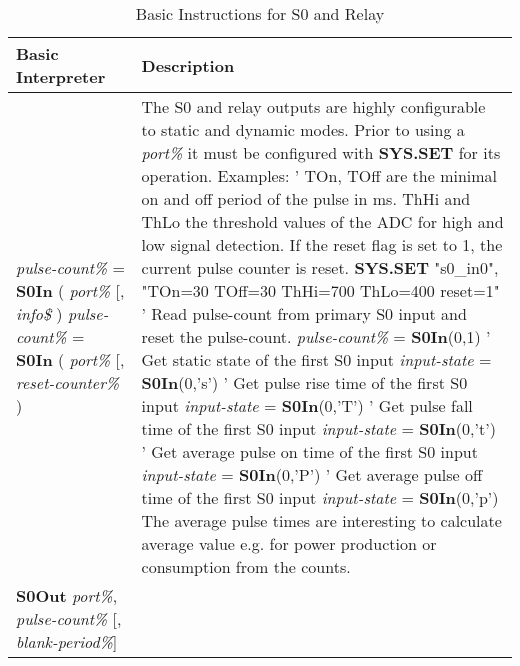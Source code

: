\begin{table}[]
\centering
\caption{Basic Instructions for S0 and Relay}
\label{Basic_Instructions_for_S0_relay}
\begin{tabular}{|p{4cm}|p{10cm}|}
\hline
\textbf{Basic Interpreter} & \textbf{Description}                                                   \\ \hline
\textit{pulse-count\%} = \textbf{S0In} ( \textit{port\%} [, \textit{info\$} )\newline
\textit{pulse-count\%} = \textbf{S0In} ( \textit{port\%} [, \textit{reset-counter\%} )
& The S0 and relay outputs are highly configurable to static and dynamic modes. Prior to using a \textit{port\%} it must be configured with \textbf{SYS.SET} for its operation.\newline
Examples:\newline
' TOn, TOff are the minimal on and off period of the pulse in ms. ThHi and ThLo the threshold values of the ADC for high and low signal detection. If the reset flag is set to 1, the current pulse counter is reset.\newline
\textbf{SYS.SET} "s0\_in0", "TOn=30 TOff=30 ThHi=700 ThLo=400 reset=1"\newline
' Read pulse-count from primary S0 input and reset the pulse-count.\newline
\textit{pulse-count\%} = \textbf{S0In}(0,1)\newline       
' Get static state of the first S0 input\newline
\textit{input-state} = \textbf{S0In}(0,'s')\newline
' Get pulse rise time of the first S0 input\newline
\textit{input-state} = \textbf{S0In}(0,'T')\newline
' Get pulse fall time of the first S0 input\newline
\textit{input-state} = \textbf{S0In}(0,'t')\newline
' Get average pulse on time of the first S0 input\newline
\textit{input-state} = \textbf{S0In}(0,'P')\newline
' Get average pulse off time of the first S0 input\newline
\textit{input-state} = \textbf{S0In}(0,'p')\newline
The average pulse times are interesting to calculate average value e.g. for power production or consumption from the counts.
\\ \hline
\textbf{S0Out} \textit{port\%}, \textit{pulse-count\%} [, \textit{blank-period\%}]

\end{tabular}
\end{table}
